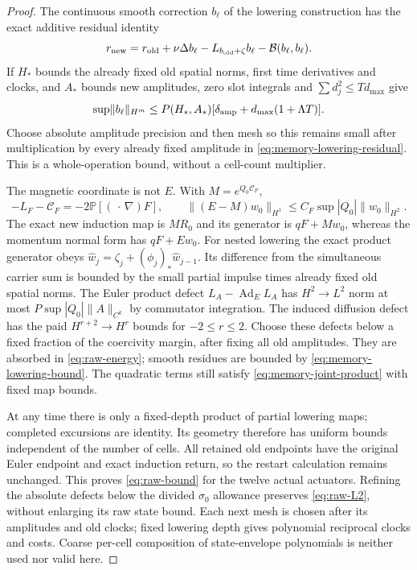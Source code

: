 \documentclass[11pt,a4paper]{amsart}
\theoremstyle{definition}
\theoremstyle{remark}
\numberwithin{equation}{section}
\newcommand{\PP}{\mathbb P}
\newcommand{\Bcal}{\mathcal B}
\newcommand{\Ccal}{\mathcal C}
\newcommand{\norm}[1]{\lVert #1\rVert}
\begin{document}
\begin{proof}
The continuous smooth correction $b_\ell$ of the lowering construction has
the exact additive residual identity
\begin{equation}\label{eq:memory-lowering-residual}
 r_{\rm new}=r_{\rm old}+\nu\Delta b_\ell
       -L_{b_{\rm old}+\zeta}b_\ell-\Bcal(b_\ell,b_\ell).
\end{equation}
If $H_*$ bounds the already fixed old spatial norms, first time derivatives
and clocks, and $A_*$ bounds new amplitudes, zero slot integrals and
$\sum d_j^2\le T d_{\max}$ give
\begin{equation}\label{eq:memory-lowering-bound}
 \sup\norm{b_\ell}_{H^m}
 \le P(H_*,A_*)[\delta_{\rm amp}+d_{\max}(1+\Lambda T)].
\end{equation}
Choose absolute amplitude precision and then mesh so this remains small
after multiplication by every already fixed amplitude in
\eqref{eq:memory-lowering-residual}.  This is a whole-operation bound,
without a cell-count multiplier.

The magnetic coordinate is not $E$.  With $M=e^{Q_0\Ccal_F}$,
\begin{equation}\label{eq:memory-E-M}
 -L_F-\Ccal_F=-2\PP[(\,\cdot\,\nabla)F],\qquad
 \norm{(E-M)w_0}_{H^1}
       \le C_F\sup|Q_0|\norm{w_0}_{H^2}.
\end{equation}
The exact new induction map is $MR_0$ and its generator is
$qF+Mw_0$, whereas the momentum normal form has $qF+Ew_0$.
For nested lowering the exact product generator obeys
$\widehat w_j=\zeta_j+(\phi_j)_*\widehat w_{j-1}$.
Its difference from the simultaneous carrier sum is bounded by the small
partial impulse times already fixed old spatial norms.  The Euler product
defect $L_A-\operatorname{Ad}_E L_A$ has $H^2\to L^2$ norm at most
$P\sup|Q_0|\norm A_{C^k}$ by commutator integration.  The induced diffusion
defect has the paid $H^{r+2}\to H^r$ bounds for $-2\le r\le2$.
Choose these defects below a fixed fraction of the coercivity margin,
after fixing all old amplitudes.  They are absorbed in
\eqref{eq:raw-energy}; smooth residues are bounded by
\eqref{eq:memory-lowering-bound}.  The quadratic terms still satisfy
\eqref{eq:memory-joint-product} with fixed map bounds.

At any time there is only a fixed-depth product of partial lowering maps;
completed excursions are identity.  Its geometry therefore has uniform
bounds independent of the number of cells.  All retained old endpoints
have the original Euler endpoint and exact induction return, so the
restart calculation remains unchanged.  This proves
\eqref{eq:raw-bound} for the twelve actual actuators.  Refining the absolute
defects below the divided $\sigma_0$ allowance preserves
\eqref{eq:raw-L2}, without enlarging its raw state bound.  Each next mesh
is chosen after its amplitudes and old clocks; fixed lowering depth gives
polynomial reciprocal clocks and costs.  Coarse per-cell composition of
state-envelope polynomials is neither used nor valid here.
\end{proof}
\end{document}
